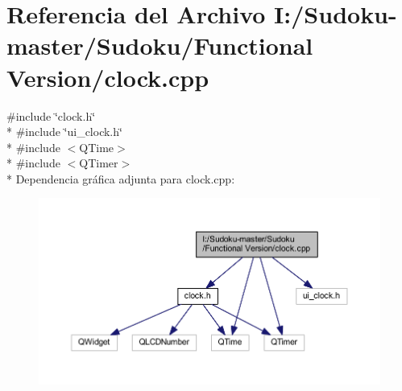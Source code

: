 \section{Referencia del Archivo I\-:/\-Sudoku-\/master/\-Sudoku/\-Functional Version/clock.cpp}
\label{clock_8cpp}
{\ttfamily \#include \char`\"{}clock.\-h\char`\"{}}\\*
{\ttfamily \#include \char`\"{}ui\-\_\-clock.\-h\char`\"{}}\\*
{\ttfamily \#include $<$Q\-Time$>$}\\*
{\ttfamily \#include $<$Q\-Timer$>$}\\*
Dependencia gráfica adjunta para clock.\-cpp\-:
\nopagebreak
\begin{figure}[H]
\begin{center}
\leavevmode
\includegraphics[width=350pt]{clock_8cpp__incl}
\end{center}
\end{figure}
